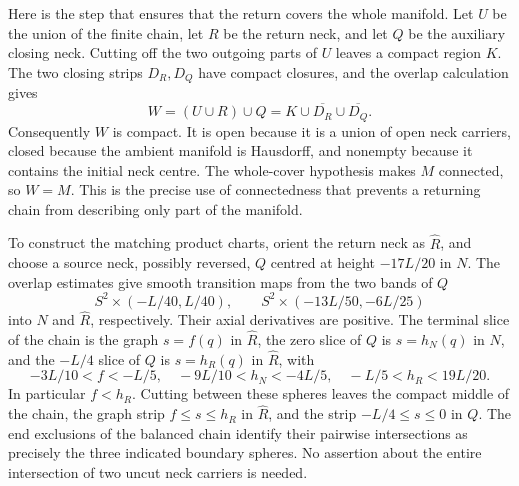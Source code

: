 Here is the step that ensures that the return covers the whole manifold.
Let $U$ be the union of the finite chain, let $R$ be the return neck, and
let $Q$ be the auxiliary closing neck.  Cutting off the two outgoing parts of
$U$ leaves a compact region $K$.  The two closing strips $D_R,D_Q$ have
compact closures, and the overlap calculation gives
\[
 W=(U\cup R)\cup Q=K\cup\overline{D_R}\cup\overline{D_Q}.
\]
Consequently $W$ is compact.  It is open because it is a union of open neck
carriers, closed because the ambient manifold is Hausdorff, and nonempty
because it contains the initial neck centre.  The whole-cover hypothesis
makes $M$ connected, so $W=M$.  This is the precise use of connectedness
that prevents a returning chain from describing only part of the manifold.

To construct the matching product charts, orient the return neck as
$\widehat R$, and choose a source neck, possibly
reversed, $Q$ centred at height $-17L/20$ in $N$.  The overlap estimates
give smooth transition maps from the two bands of $Q$
\[
 S^2\times(-L/40,L/40),\qquad
 S^2\times(-13L/50,-6L/25)
\]
into $N$ and $\widehat R$, respectively.  Their axial derivatives are
positive.  The terminal slice of the chain is the graph $s=f(q)$ in
$\widehat R$, the zero slice of $Q$ is $s=h_N(q)$ in $N$, and the
$-L/4$ slice of $Q$ is $s=h_R(q)$ in $\widehat R$, with
\[
 -3L/10<f<-L/5,\quad -9L/10<h_N<-4L/5,
 \quad -L/5<h_R<19L/20.
\]
In particular $f<h_R$.  Cutting between these spheres leaves the
compact middle of the chain, the graph strip $f\le s\le h_R$ in
$\widehat R$, and the strip $-L/4\le s\le0$ in $Q$.  The end
exclusions of the balanced chain identify their pairwise intersections
as precisely the three indicated boundary spheres.  No assertion about
the entire intersection of two uncut neck carriers is needed.

